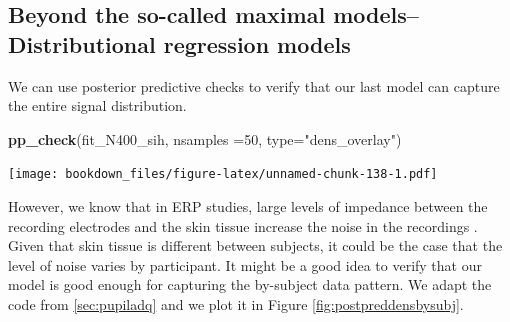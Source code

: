 \documentclass[12pt,]{krantz}
\newenvironment{Shaded}{\begin{snugshade}}{\end{snugshade}}
\newcommand{\DataTypeTok}[1]{\textcolor[rgb]{0.13,0.29,0.53}{#1}}
\newcommand{\DecValTok}[1]{\textcolor[rgb]{0.00,0.00,0.81}{#1}}
\newcommand{\KeywordTok}[1]{\textcolor[rgb]{0.13,0.29,0.53}{\textbf{#1}}}
\newcommand{\NormalTok}[1]{#1}
\newcommand{\StringTok}[1]{\textcolor[rgb]{0.31,0.60,0.02}{#1}}
\theoremstyle{definition}
\theoremstyle{definition}
\theoremstyle{definition}
\theoremstyle{remark}
\begin{document}
\hypertarget{sec:distrmodel}{%
\subsection{Beyond the so-called maximal models--Distributional regression models}\label{sec:distrmodel}}

We can use posterior predictive checks to verify that our last model can capture the entire signal distribution.

\begin{Shaded}
\begin{Highlighting}[]
\KeywordTok{pp_check}\NormalTok{(fit_N400_sih, }\DataTypeTok{nsamples =}\DecValTok{50}\NormalTok{, }\DataTypeTok{type=}\StringTok{"dens_overlay"}\NormalTok{)}
\end{Highlighting}
\end{Shaded}

\texttt{[image: bookdown\_files/figure-latex/unnamed-chunk-138-1.pdf]}

However, we know that in ERP studies, large levels of impedance between the recording electrodes and the skin tissue increase the noise in the recordings \citep{ref} . Given that skin tissue is different between subjects, it could be the case that the level of noise varies by participant.
It might be a good idea to verify that our model is good enough for capturing the by-subject data pattern. We adapt the code from \ref{sec:pupiladq} and we plot it in Figure \ref{fig:postpreddensbysubj}.
\end{document}
